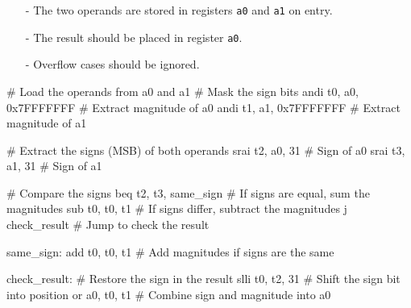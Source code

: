 \begin{itemize}
    \item[-] The two operands are stored in registers \texttt{a0} and \texttt{a1} on entry.
    \item[-] The result should be placed in register \texttt{a0}.
    \item[-] Overflow cases should be ignored.
\end{itemize}

\begin{assembly}
# Load the operands from a0 and a1
# Mask the sign bits
andi t0, a0, 0x7FFFFFFF   # Extract magnitude of a0
andi t1, a1, 0x7FFFFFFF   # Extract magnitude of a1

# Extract the signs (MSB) of both operands
srai t2, a0, 31           # Sign of a0
srai t3, a1, 31           # Sign of a1

# Compare the signs
beq t2, t3, same_sign     # If signs are equal, sum the magnitudes
sub t0, t0, t1            # If signs differ, subtract the magnitudes
j check_result            # Jump to check the result

same_sign:
    add t0, t0, t1            # Add magnitudes if signs are the same

check_result:
    # Restore the sign in the result
    slli t0, t2, 31           # Shift the sign bit into position
    or a0, t0, t1             # Combine sign and magnitude into a0
\end{assembly}














